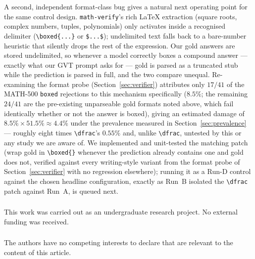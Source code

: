 \documentclass[runningheads]{llncs}
\begin{document}
A second, independent format-class bug gives a natural next operating point
for the same control design. \texttt{math-verify}'s rich LaTeX extraction
(square roots, complex numbers, tuples, polynomials) only activates inside a
recognised delimiter (\verb|\boxed{...}| or \verb|$...$|); undelimited text
falls back to a bare-number heuristic that silently drops the rest of the
expression. Our gold answers are stored undelimited, so whenever a model
correctly boxes a compound answer --- exactly what our GVT prompt asks for
--- gold is parsed as a truncated stub while the prediction is parsed in
full, and the two compare unequal. Re-examining the format probe
(Section~\ref{sec:verifier}) attributes only $17/41$ of the MATH-500
\texttt{boxed} rejections to this mechanism specifically ($8.5\%$; the
remaining $24/41$ are the pre-existing unparseable gold formats noted
above, which fail identically whether or not the answer is boxed), giving
an estimated damage of $8.5\% \times 51.5\% \approx 4.4\%$ under the
prevalence measured in Section~\ref{sec:prevalence} --- roughly eight times
\verb|\dfrac|'s $0.55\%$ and, unlike \verb|\dfrac|, untested by this or any
study we are aware of. We implemented and unit-tested the
matching patch (wrap gold in \verb|\boxed{}| whenever the prediction already
contains one and gold does not, verified against every writing-style
variant from the format probe of Section~\ref{sec:verifier} with no
regression elsewhere); running it as a
Run-D control against the chosen headline configuration, exactly as Run~B
isolated the \verb|\dfrac| patch against Run~A, is queued next.

\begin{credits}
\subsubsection{\ackname}
This work was carried out as an undergraduate research project. No external
funding was received.

\subsubsection{\discintname}
The authors have no competing interests to declare that are relevant to the
content of this article.
\end{credits}
\end{document}
